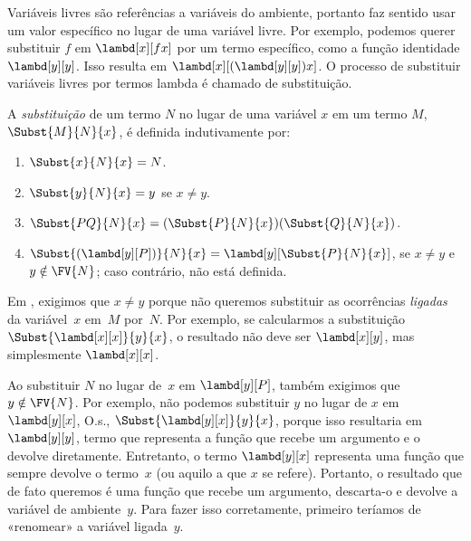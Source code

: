 \documentclass[../../../include/open-logic-section]{subfiles}
\begin{document}

\begin{explain}
Variáveis livres são referências a variáveis do ambiente, portanto faz
sentido usar um valor específico no lugar de uma variável livre. Por exemplo,
podemos querer substituir $f$ em $\lambd[x][f x]$ por um termo específico,
como a função identidade $\lambd[y][y]$. Isso resulta em
$\lambd[x][(\lambd[y][y]) x]$. O processo de substituir variáveis livres por
termos lambda é chamado de substituição.
\end{explain}

\begin{defn}[Substituição] 
  A \emph{substituição} de um termo $N$ no lugar de uma variável $x$ em um termo
  $M$, $\Subst{M}{N}{x}$, é definida indutivamente por:
  \begin{enumerate}
    \item $\Subst{x}{N}{x} = N$.  
    \item $\Subst{y}{N}{x}  = y$ se $x \neq y$.  
    \item $\Subst{PQ}{N}{x}  = (\Subst{P}{N}{x}) (\Subst{Q}{N}{x})$.
    \item $\Subst{(\lambd[y][P])}{N}{x} = \lambd[y][\Subst{P}{N}{x}]$,
      se $x \neq y$ e $y \notin \FV{N}$; caso contrário, não está definida.
  \end{enumerate}
\end{defn}

\begin{explain}
Em , exigimos que $x
\neq y$ porque não queremos substituir as ocorrências \emph{ligadas} da
variável~$x$ em~$M$ por~$N$. Por exemplo, se calcularmos a
substituição $\Subst{\lambd[x][x]}{y}{x}$, o resultado não deve ser
$\lambd[x][y]$, mas simplesmente $\lambd[x][x]$.

Ao substituir $N$ no lugar de~$x$ em $\lambd[y][P]$, também exigimos que
$y \notin \FV{N}$. Por exemplo, não podemos substituir $y$ no lugar de $x$ em
$\lambd[y][x]$, O.s.\@, $\Subst{\lambd[y][x]}{y}{x}$, porque isso resultaria
em $\lambd[y][y]$, termo que representa a função que recebe um argumento e o
devolve diretamente. Entretanto, o termo $\lambd[y][x]$ representa uma
função que sempre devolve o termo~$x$ (ou aquilo a que $x$ se refere).
Portanto, o resultado que de fato queremos é uma função que recebe um
argumento, descarta-o e devolve a variável de ambiente~$y$. Para fazer isso
corretamente, primeiro teríamos de «renomear» a variável ligada~$y$.
\end{explain}
\end{document}
